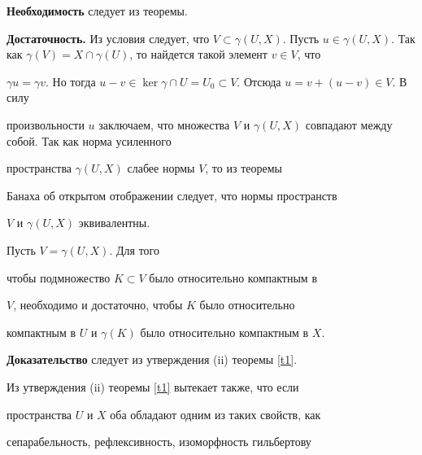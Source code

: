\begin{pf} {\bf Необходимость} следует из теоремы.


\smallskip





{\bf Достаточность.} Из условия следует, что $V \subset


\gamma (U,X)$. Пусть $u \in \gamma (U,X)$. Так как $\gamma(V) =


X \cap \gamma (U)$, то найдется такой элемент $v \in V$, что


$\gamma u=\gamma v$. Но тогда $u-v \in \ker \gamma \cap U=U_0


\subset V$. Отсюда $u=v+(u-v) \in V$. В силу


произвольности $u$ заключаем, что множества $V$ и $\gamma


(U,X)$ совпадают между собой. Так как норма усиленного


пространства $\gamma(U,X)$ слабее нормы $V$, то из теоремы


Банаха об открытом отображении следует, что нормы пространств


$V$ и $\gamma(U,X)$ эквивалентны.


\end{pf}





\begin{cor}


Пусть $V=\gamma (U,X)$. Для того


чтобы подмножество $K \subset V$ было относительно компактным в


$V$, необходимо и достаточно, чтобы $K$ было относительно


компактным в $U$ и $\gamma (K)$ было относительно компактным в $X$. 


\end{cor}





{\bf Доказательство} следует из утверждения (ii) теоремы \ref{t1}.


\medskip





Из утверждения (ii) теоремы \ref{t1} вытекает также, что если


пространства $U$ и $X$ оба обладают одним из таких свойств, как


сепарабельность, рефлексивность, изоморфность гильбертову


